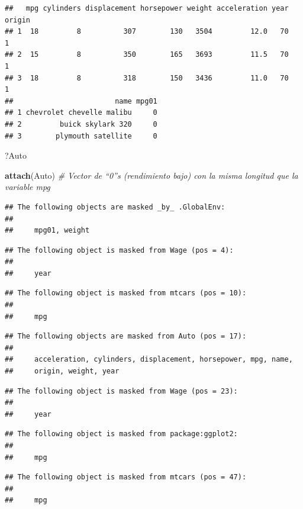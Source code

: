 \documentclass[]{book}
\newenvironment{Shaded}{\begin{snugshade}}{\end{snugshade}}
\newcommand{\KeywordTok}[1]{\textcolor[rgb]{0.13,0.29,0.53}{\textbf{#1}}}
\newcommand{\CommentTok}[1]{\textcolor[rgb]{0.56,0.35,0.01}{\textit{#1}}}
\newcommand{\NormalTok}[1]{#1}
\begin{document}
\begin{verbatim}
##   mpg cylinders displacement horsepower weight acceleration year origin
## 1  18         8          307        130   3504         12.0   70      1
## 2  15         8          350        165   3693         11.5   70      1
## 3  18         8          318        150   3436         11.0   70      1
##                        name mpg01
## 1 chevrolet chevelle malibu     0
## 2         buick skylark 320     0
## 3        plymouth satellite     0
\end{verbatim}

\begin{Shaded}
\begin{Highlighting}[]
\NormalTok{?Auto}

\KeywordTok{attach}\NormalTok{(Auto) }\CommentTok{# Vector de “0”s (rendimiento bajo) con la misma longitud que la variable mpg }
\end{Highlighting}
\end{Shaded}

\begin{verbatim}
## The following objects are masked _by_ .GlobalEnv:
## 
##     mpg01, weight
\end{verbatim}

\begin{verbatim}
## The following object is masked from Wage (pos = 4):
## 
##     year
\end{verbatim}

\begin{verbatim}
## The following object is masked from mtcars (pos = 10):
## 
##     mpg
\end{verbatim}

\begin{verbatim}
## The following objects are masked from Auto (pos = 17):
## 
##     acceleration, cylinders, displacement, horsepower, mpg, name,
##     origin, weight, year
\end{verbatim}

\begin{verbatim}
## The following object is masked from Wage (pos = 23):
## 
##     year
\end{verbatim}

\begin{verbatim}
## The following object is masked from package:ggplot2:
## 
##     mpg
\end{verbatim}

\begin{verbatim}
## The following object is masked from mtcars (pos = 47):
## 
##     mpg
\end{verbatim}
\end{document}
